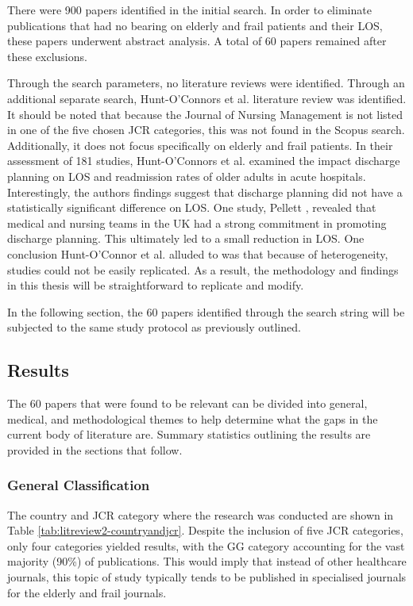 \documentclass[../thesis.tex]{subfiles}
\begin{document}
There were 900 papers identified in the initial search. In order to eliminate publications that had no bearing on elderly and frail patients and their LOS, these papers underwent abstract analysis. A total of 60 papers remained after these exclusions.

Through the search parameters, no literature reviews were identified. Through an additional separate search, Hunt-O'Connors et al. \cite{OConnor2021} literature review was identified. It should be noted that because the Journal of Nursing Management is not listed in one of the five chosen JCR categories, this was not found in the Scopus search. Additionally, it does not focus specifically on elderly and frail patients. In their assessment of 181 studies, Hunt-O'Connors et al. \cite{OConnor2021} examined the impact discharge planning on LOS and readmission rates of older adults in acute hospitals. Interestingly, the authors findings suggest that discharge planning did not have a statistically significant difference on LOS. One study, Pellett \cite{Pellett2016}, revealed that medical and nursing teams in the UK had a strong commitment in promoting discharge planning. This ultimately led to a small reduction in LOS. One conclusion Hunt-O'Connor et al. \cite{OConnor2021} alluded to was that because of heterogeneity, studies could not be easily replicated. As a result, the methodology and findings in this thesis will be straightforward to replicate and modify. 

In the following section, the 60 papers identified through the search string will be subjected to the same study protocol as previously outlined. 

\subsection{Results}\label{sec:lr2results}
The 60 papers that were found to be relevant can be divided into general, medical, and methodological themes to help determine what the gaps in the current body of literature are. Summary statistics outlining the results are provided in the sections that follow.

\subsubsection{General Classification}
The country and JCR category where the research was conducted are shown in Table \ref{tab:litreview2-countryandjcr}. Despite the inclusion of five JCR categories, only four categories yielded results, with the GG category accounting for the vast majority (90\%) of publications. This would imply that instead of other healthcare journals, this topic of study typically tends to be published in specialised journals for the elderly and frail journals.
\end{document}

